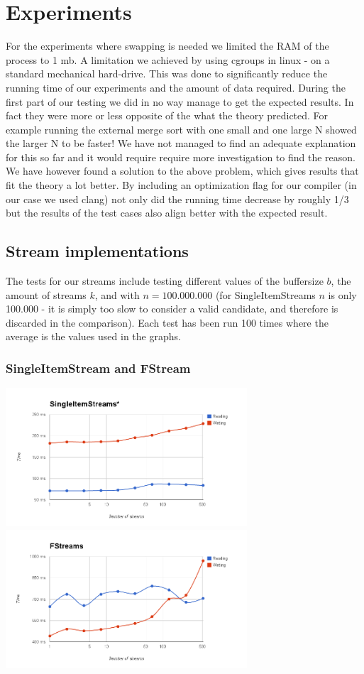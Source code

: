 \section{Experiments}

For the experiments where swapping is needed we limited the RAM of the process to 1 mb. A limitation we achieved by using cgroups in linux - on a standard mechanical hard-drive. This was done to significantly reduce the running time of our experiments and the amount of data required. 
During the first part of our testing we did in no way manage to get the expected results. In fact they were more or less opposite of the what the theory predicted. For example running the external merge sort with one small and one large N showed the larger N to be faster! We have not managed to find an adequate explanation for this so far and it would require require more investigation to find the reason.
We have however found a solution to the above problem, which gives results that fit the theory a lot better. By including an optimization flag for our compiler (in our case we used clang) not only did the running time decrease by roughly 1/3 but the results of the test cases also align better with the expected result. 

\subsection{Stream implementations}
The tests for our streams include testing different values of the buffersize $b$, the amount of streams $k$, and with $n = 100.000.000$ (for SingleItemStreams $n$ is only 100.000 - it is simply too slow to consider a valid candidate, and therefore is discarded in the comparison). 
Each test has been run 100 times where the average is the values used in the graphs. 

\subsubsection{SingleItemStream and FStream}
\includegraphics[width=90mm]{graphics/SIS.png}
\includegraphics[width=90mm]{graphics/FS.png}

